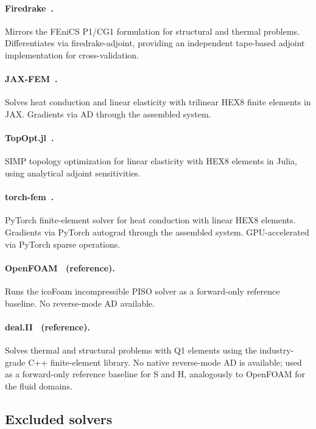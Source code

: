 \documentclass{article}
\begin{document}
\paragraph{Firedrake~\cite{rathgeber2016firedrake}.}
Mirrors the FEniCS P1/CG1 formulation for structural and thermal problems.
Differentiates via firedrake-adjoint, providing an independent
tape-based adjoint implementation for cross-validation.

\paragraph{JAX-FEM~\cite{xue2023jaxfem}.}
Solves heat conduction and linear elasticity with trilinear HEX8 finite
elements in JAX. Gradients via AD through the assembled system.

\paragraph{TopOpt.jl~\cite{huang2021topoptjl}.}
SIMP topology optimization for linear elasticity with HEX8 elements in
Julia, using analytical adjoint sensitivities.

\paragraph{torch-fem~\cite{meyer2024torchfem}.}
PyTorch finite-element solver for heat conduction with linear HEX8 elements.
Gradients via PyTorch autograd through the assembled system.
GPU-accelerated via PyTorch sparse operations.

\paragraph{OpenFOAM~\cite{weller1998tensorial} (reference).}
Runs the icoFoam incompressible PISO solver as a forward-only reference
baseline. No reverse-mode AD available.

\paragraph{deal.II~\cite{bangerth2007dealii,arndt2023dealii} (reference).}
Solves thermal and structural problems with Q1 elements using the
industry-grade C++ finite-element library.
No native reverse-mode AD is available; used as a forward-only reference
baseline for S and H, analogously to OpenFOAM for the fluid domains.

\subsection{Excluded solvers}
\label{app:excluded}
\end{document}
